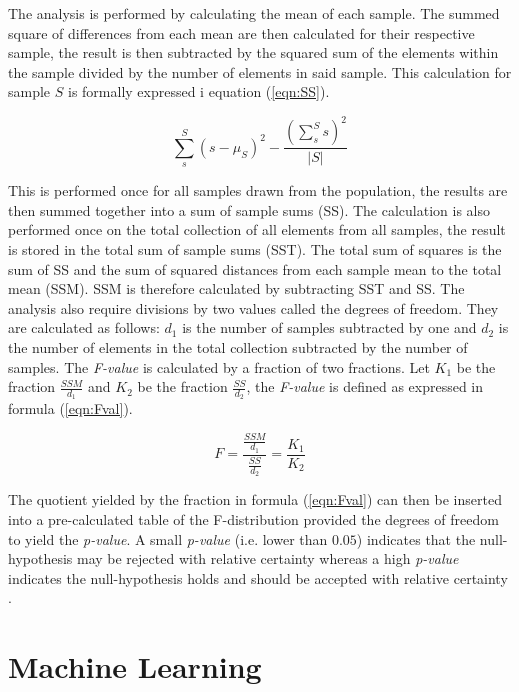 The analysis is performed by calculating the mean of each sample. The summed square of differences from each mean are then calculated for their respective sample, the result is then subtracted by the squared sum of the elements within the sample divided by the number of elements in said sample. This calculation for sample $S$ is formally expressed i equation (\ref{eqn:SS}).

\begin{equation}
\label{eqn:SS}
 \sum_s^S (s - \mu_S)^2 - \frac{(\sum_{s}^{S} s)^2}{|S|} 
\end{equation}

This is performed once for all samples drawn from the population, the results are then summed together into a sum of sample sums (SS). The calculation is also performed once on the total collection of all elements from all samples, the result is stored in the total sum of sample sums (SST). The total sum of squares is the sum of SS and the sum of squared distances from each sample mean to the total mean (SSM). SSM is therefore calculated by subtracting SST and SS. The analysis also require divisions by two values called the degrees of freedom. They are calculated as follows: $d_1$ is the number of samples subtracted by one and $d_2$ is the number of elements in the total collection subtracted by the number of samples. The \textit{F-value} is calculated by a fraction of two fractions. Let  $K_1$ be the fraction $\frac{SSM}{d_1}$ and $K_2$ be the fraction $\frac{SS}{d_2}$, the \textit{F-value} is defined as expressed in formula (\ref{eqn:Fval}).

\begin{equation}
\label{eqn:Fval}
 F = \frac{\frac{SSM}{d_1}}{\frac{SS}{d_2}} = \frac{K_1}{K_2}
\end{equation}

The quotient yielded by the fraction in formula (\ref{eqn:Fval}) can then be inserted into a pre-calculated table of the F-distribution provided the degrees of freedom to yield the \textit{p-value}. A small \textit{p-value} (i.e. lower than $0.05$) indicates that the null-hypothesis may be rejected with relative certainty whereas a high \textit{p-value} indicates the null-hypothesis holds and should be accepted with relative certainty \cite{lowry2014concepts}.


\section{Machine Learning}

